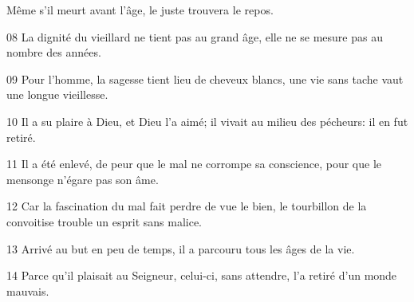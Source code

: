 Même s’il meurt avant l’âge, le juste trouvera le repos.

08 La dignité du vieillard ne tient pas au grand âge, elle ne se mesure pas au nombre des années.

09 Pour l’homme, la sagesse tient lieu de cheveux blancs, une vie sans tache vaut une longue vieillesse.

10 Il a su plaire à Dieu, et Dieu l’a aimé; il vivait au milieu des pécheurs: il en fut retiré.

11 Il a été enlevé, de peur que le mal ne corrompe sa conscience, pour que le mensonge n’égare pas son âme.

12 Car la fascination du mal fait perdre de vue le bien, le tourbillon de la convoitise trouble un esprit sans malice.

13 Arrivé au but en peu de temps, il a parcouru tous les âges de la vie.

14 Parce qu’il plaisait au Seigneur, celui-ci, sans attendre, l’a retiré d’un monde mauvais. 
